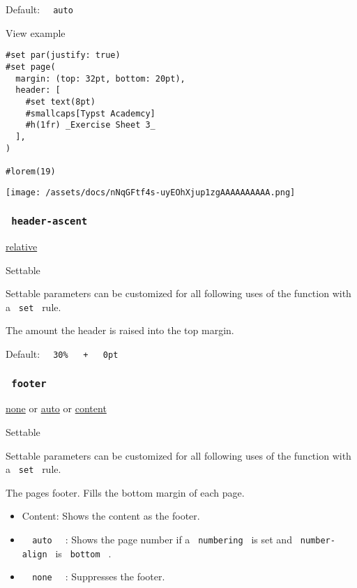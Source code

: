 Default: \texttt{\ }{\texttt{\ auto\ }}\texttt{\ }


View example

\begin{verbatim}
#set par(justify: true)
#set page(
  margin: (top: 32pt, bottom: 20pt),
  header: [
    #set text(8pt)
    #smallcaps[Typst Academcy]
    #h(1fr) _Exercise Sheet 3_
  ],
)

#lorem(19)
\end{verbatim}

\texttt{[image: /assets/docs/nNqGFtf4s-uyEOhXjup1zgAAAAAAAAAA.png]}

\subsubsection{\texorpdfstring{\texttt{\ header-ascent\ }}{ header-ascent }}\label{parameters-header-ascent}

\href{/docs/reference/layout/relative/}{relative}

{{ Settable }}

\label{parameters-header-ascent-settable-tooltip}
Settable parameters can be customized for all following uses of the
function with a \texttt{\ set\ } rule.

The amount the header is raised into the top margin.

Default:
\texttt{\ }{\texttt{\ 30\%\ }}\texttt{\ }{\texttt{\ +\ }}\texttt{\ }{\texttt{\ 0pt\ }}\texttt{\ }

\subsubsection{\texorpdfstring{\texttt{\ footer\ }}{ footer }}\label{parameters-footer}

\href{/docs/reference/foundations/none/}{none} {or}
\href{/docs/reference/foundations/auto/}{auto} {or}
\href{/docs/reference/foundations/content/}{content}

{{ Settable }}

\label{parameters-footer-settable-tooltip}
Settable parameters can be customized for all following uses of the
function with a \texttt{\ set\ } rule.

The page\textquotesingle s footer. Fills the bottom margin of each page.

\begin{itemize}
\tightlist
\item
  Content: Shows the content as the footer.
\item
  \texttt{\ }{\texttt{\ auto\ }}\texttt{\ } : Shows the page number if a
  \texttt{\ numbering\ } is set and \texttt{\ number-align\ } is
  \texttt{\ bottom\ } .
\item
  \texttt{\ }{\texttt{\ none\ }}\texttt{\ } : Suppresses the footer.
\end{itemize}

